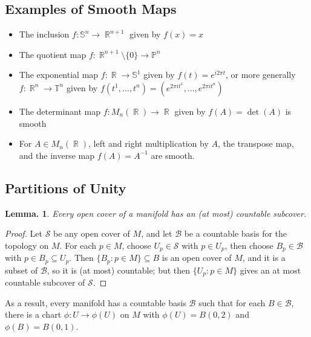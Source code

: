 \documentclass[11pt, a4paper]{memoir}
\DeclareMathOperator{\R}{{\mathbb{R}}}
\theoremstyle{change}
\newtheorem{lemma}[theorem]{Lemma.}
\theoremstyle{plain}
\theoremstyle{nonumberplain}
\newtheorem{proof}{Proof}
\numberwithin{equation}{section}
\begin{document}
\subsection{Examples of Smooth Maps}
\begin{itemize}[nl]
    \item The inclusion $f:\mathbb{S}^n\to\R^{n+1}$ given by $f(x)=x$
    \item The quotient map $f:\R^{n+1}\setminus\{0\}\to\mathbb{P}^n$
    \item The exponential map $f:\R\to\mathbb{S}^1$ given by $f(t)=e^{i2\pi t}$, or more generally $f:\R^n\to\mathbb{T}^n$ given by $f(t^1,\ldots,t^n)=(e^{2\pi i t^1},\ldots,e^{2\pi i t^n})$
    \item The determinant map $f:M_n(\R)\to\R$ given by $f(A)=\det(A)$ is smooth
    \item For $A\in M_n(\R)$, left and right multiplication by $A$, the transpose map, and the inverse map $f(A)=A^{-1}$ are smooth.
\end{itemize}
\subsection{Partitions of Unity}
\begin{lemma}
    Every open cover of a manifold has an (at most) countable subcover.
\end{lemma}
\begin{proof}
    Let $\mathcal{S}$ be any open cover of $M$, and let $\mathcal{B}$ be a countable basis for the topology on $M$.
    For each $p\in M$, choose $U_p\in\mathcal{S}$ with $p\in U_p$, then choose $B_p\in\mathcal{B}$ with $p\in B_p\subseteq U_p$.
    Then $\{B_p:p\in M\}\subseteq B$ is an open cover of $M$, and it is a subset of $\mathcal{B}$, so it is (at most) countable; but then $\{U_p:p\in M\}$ gives an at most countable subcover of $\mathcal{S}$.
\end{proof}
As a result, every manifold has a countable basis $\mathcal{B}$ such that for each $B\in\mathcal{B}$, there is a chart $\phi:U\to\phi(U)$ on $M$ with $\phi(U)=B(0,2)$ and $\phi(B)=B(0,1)$.
\end{document}
